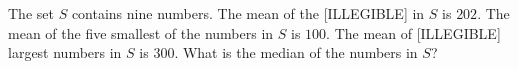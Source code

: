 The set $S$ contains nine numbers. The mean of the [ILLEGIBLE] in $S$ is $202$. The mean of the five smallest of the numbers in $S$ is $100$. The mean of [ILLEGIBLE] largest numbers in $S$ is $300$. What is the median of the numbers in $S$?
